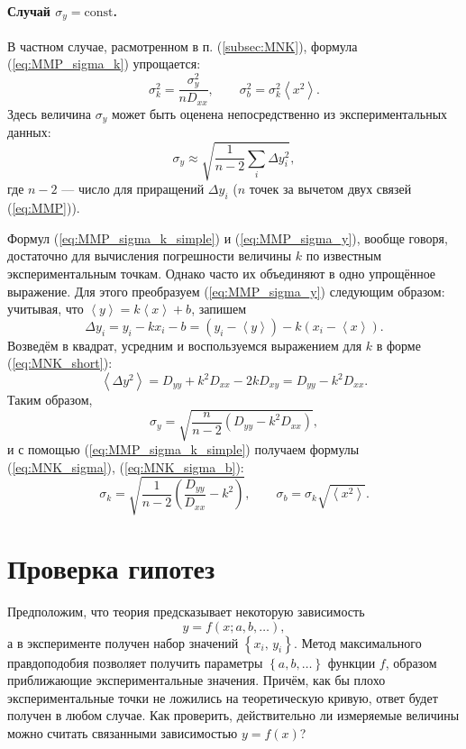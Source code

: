 \paragraph{Случай $\sigma_{y}=\mathrm{const}$.}

В частном случае, расмотренном в п. (\ref{subsec:MNK}),
формула (\ref{eq:MMP_sigma_k}) упрощается:
\begin{equation}
\boxed{\sigma_{k}^{2}=\frac{\sigma_{y}^{2}}{nD_{xx}},\qquad\sigma_{b}^{2}=\sigma_{k}^{2}\left\langle x^{2}\right\rangle }.\label{eq:MMP_sigma_k_simple}
\end{equation}
Здесь величина $\sigma_{y}$ может быть оценена непосредственно из
экспериментальных данных:
\begin{equation}
\sigma_{y}\approx\sqrt{\frac{1}{n-2}\sum_{i}\Delta y_{i}^{2}},\label{eq:MMP_sigma_y}
\end{equation}
где $n-2$ --- число 
для приращений $\Delta y_{i}$ ($n$ точек за вычетом двух связей
(\ref{eq:MMP})).

Формул (\ref{eq:MMP_sigma_k_simple}) и (\ref{eq:MMP_sigma_y}),
вообще говоря, достаточно для вычисления погрешности величины $k$
по известным экспериментальным точкам. Однако часто их объединяют
в одно упрощённое выражение. Для этого преобразуем (\ref{eq:MMP_sigma_y})
следующим образом: учитывая, что $\left\langle y\right\rangle =k\left\langle x\right\rangle +b$,
запишем 
\[
\Delta y_{i}=y_{i}-kx_{i}-b=\left(y_{i}-\left\langle y\right\rangle \right)-k\left(x_{i}-\left\langle x\right\rangle \right).
\]
Возведём в квадрат, усредним и воспользуемся выражением для $k$ в
форме (\ref{eq:MNK_short}):
\[
\left\langle \Delta y^{2}\right\rangle =D_{yy}+k^{2}D_{xx}-2kD_{xy}=D_{yy}-k^{2}D_{xx}.
\]
Таким образом, 
\[
\sigma_{y}=\sqrt{\frac{n}{n-2}\left(D_{yy}-k^{2}D_{xx}\right)},
\]
и с помощью (\ref{eq:MMP_sigma_k_simple}) получаем формулы (\ref{eq:MNK_sigma}),
(\ref{eq:MNK_sigma_b}):
\[
\boxed{\sigma_{k}=\sqrt{\frac{1}{n-2}\left(\frac{D_{yy}}{D_{xx}}-k^{2}\right)},\qquad\sigma_{b}=\sigma_{k}\sqrt{\left\langle x^{2}\right\rangle }}.
\]

\section{{\small{}Проверка гипотез}}

Предположим, что теория предсказывает некоторую зависимость
\[
y=f\!\left(x;a,b,\ldots\right),
\]
а в эксперименте получен набор значений $\left\{ x_{i},\,y_{i}\right\} $.
Метод максимального правдоподобия позволяет получить параметры $\left\{ a,b,\ldots\right\} $
функции $f$,  образом приближающие
экспериментальные значения. Причём, как бы плохо экспериментальные
точки не ложились на теоретическую кривую, ответ будет получен в любом
случае. Как проверить, действительно ли измеряемые величины можно
считать связанными зависимостью $y=f\!\left(x\right)$?

